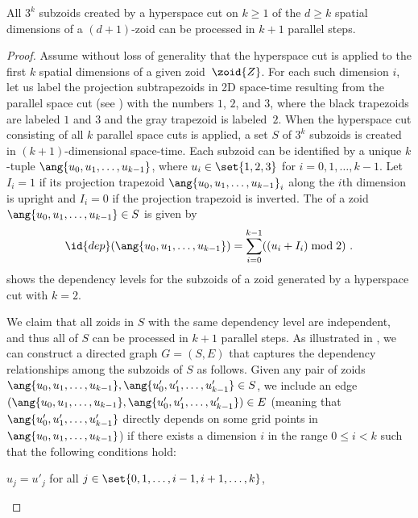 \begin{lemma}
  All $3^k$ subzoids created by a hyperspace cut on $k \geq 1$ of the
  $d \geq k$ spatial dimensions of a $(d + 1)$-zoid can be processed
  in $k + 1$ parallel steps.
\label{lem:simParallelStepsNew}
\end{lemma}
\begin{proof}
  Assume without loss of generality that the hyperspace cut is applied
  to the first $k$ spatial dimensions of a given zoid~$\zoid{Z}$.  For
  each such dimension $i$, let us label the projection subtrapezoids
  in 2D space-time resulting from the parallel space cut (see
  ) with the numbers
  $1$, $2$, and $3$, where the black trapezoids are labeled $1$ and
  $3$ and the gray trapezoid is labeled~$2$.  When the hyperspace cut
  consisting of all $k$ parallel space cuts is applied, a set $S$ of
  $3^{k}$ subzoids is created in $(k + 1)$-dimensional space-time.
  Each subzoid can be identified by a unique $k$-tuple $\ang{u_0, u_1,
    \ldots, u_{k - 1}}$, where $u_i\in\set{1,2,3}$ for $i=0,1,\ldots,
  k-1$.  Let $I_i=1$ if its projection trapezoid $\ang{u_0, u_1,
    \ldots, u_{k - 1}}_i$ along the $i$th dimension is upright and
  $I_i=0$ if the projection trapezoid is inverted.  The
   of a zoid $\ang{u_0, u_1, \ldots, u_{k -
      1}}\in S$ is given by
\[
\id{dep}(\ang{u_0, u_1, \ldots, u_{k -
      1}}) = \sum_{i=0}^{k-1}((u_i+I_i)\bmod 2)\ .
\]
 shows the dependency levels for the subzoids of a
zoid generated by a hyperspace cut with $k = 2$.  

We claim that all zoids in $S$ with the same dependency level are
independent, and thus all of $S$ can be processed in $k+1$ parallel
steps.  As illustrated in , we can construct a
directed graph $G = (S, E)$ that captures the dependency relationships
among the subzoids of $S$ as follows.  Given any pair of zoids $\ang{
  u_0, u_1, \ldots, u_{k - 1}}, \ang{u'_0, u'_1, \ldots, u'_{k -
    1}}\in S$, we include an edge $(\ang{ u_0, u_1, \ldots, u_{k -
    1}}, \ang{u'_0, u'_1, \ldots, u'_{k - 1}})\in E$ (meaning that
$\ang{u'_0, u'_1, \ldots, u'_{k - 1}}$ directly depends on some grid
points in $\ang{ u_0, u_1, \ldots, u_{k - 1}}$) if there exists a
dimension $i$ in the range $0\leq i<k$ such that the following
conditions hold:
\begin{closeitemize}

\item $u_j=u'_j$ for all $j\in\set{0,1,\ldots,i-1,i+1,\ldots,k}$, 


\end{closeitemize}
\end{proof}

